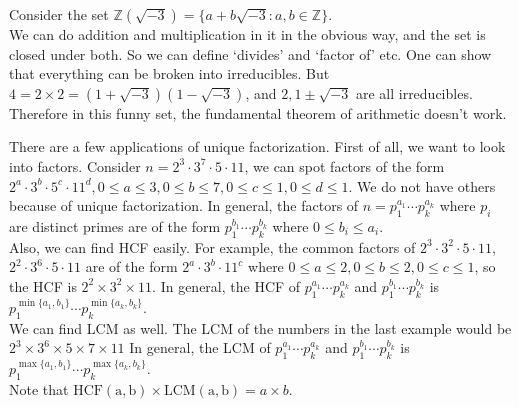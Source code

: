 \begin{example}
    Consider the set $\mathbb Z(\sqrt{-3})=\{a+b\sqrt{-3}:a,b\in\mathbb Z\}$.\\
    We can do addition and multiplication in it in the obvious way, and the set is closed under both.
    So we can define `divides' and `factor of' etc.
    One can show that everything can be broken into irreducibles.
    But $4=2\times 2=(1+\sqrt{-3})(1-\sqrt{-3})$, and $2,1\pm\sqrt{-3}$ are all irreducibles.\\
    Therefore in this funny set, the fundamental theorem of arithmetic doesn't work.
\end{example}
There are a few applications of unique factorization.
First of all, we want to look into factors.
Consider $n=2^3\cdot 3^7\cdot 5\cdot 11$, we can spot factors of the form $2^a\cdot 3^b\cdot 5^c\cdot 11^d, 0\le a\le 3, 0\le b\le 7, 0\le c\le 1, 0\le d\le 1$.
We do not have others because of unique factorization.
In general, the factors of $n=p_1^{a_1}\cdots p_k^{a_k}$ where $p_i$ are distinct primes are of the form $p_1^{b_1}\cdots p_k^{b_k}$ where $0\le b_i\le a_i$.\\
Also, we can find HCF easily.
For example, the common factors of $2^3\cdot 3^2\cdot 5\cdot 11$, $2^2\cdot 3^6\cdot 5\cdot 11$ are of the form $2^a\cdot 3^b\cdot 11^c$ where $0\le a\le 2, 0\le b\le 2, 0\le c\le 1$, so the HCF is $2^2\times 3^2\times 11$.
In general, the HCF of $p_1^{a_1}\cdots p_k^{a_k}$ and $p_1^{b_1}\cdots p_k^{b_k}$ is $p_1^{\min\{a_1,b_1\}}\cdots p_k^{\min\{a_k,b_k\}}$.\\
We can find LCM as well.
The LCM of the numbers in the last example would be $2^3\times 3^6\times 5\times 7\times 11$
In general, the LCM of $p_1^{a_1}\cdots p_k^{a_k}$ and $p_1^{b_1}\cdots p_k^{b_k}$ is $p_1^{\max\{a_1,b_1\}}\cdots p_k^{\max\{a_k,b_k\}}$.\\
Note that $\operatorname{HCF(a,b)}\times\operatorname{LCM(a,b)}=a\times b$.
